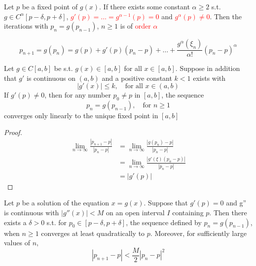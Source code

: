 \documentclass[11pt]{article}
\begin{document}
\begin{theorem}
Let $p$ be a fixed point of $g(x)$. If there exists some constant $\alpha\ge
2$ s.t. $g\in C^\alpha[p-\delta,p+\delta]$,
\textcolor{red}{$g'(p)=\dots=g^{\alpha-1}(p)=0$} and \textcolor{red}{$g^\alpha(p)\neq 0$}.
Then the iterations with $p_n=g(p_{n-1})$, $n\ge1$ is of \textcolor{red}{order $\alpha$}
\end{theorem}

\begin{equation*}
p_{n+1}=g(p_n)=g(p)+g'(p)(p_n-p)+\dots+\frac{g^\alpha(\xi_n)}{\alpha!}(p_n-p)^\alpha
\end{equation*}

\begin{theorem}
Let $g\in C[a,b]$ be s.t. $g(x)\in[a,b]$ for all $x\in[a,b]$. Suppose in
addition that $g'$ is continuous on $(a,b)$ and a positive constant $k<1$
exists with
\begin{equation*}
|g'(x)|\le k, \quad \text{for all } x\in(a,b)
\end{equation*}
If $g'(p)\neq0$, then for any number $p_0\neq p$ in $[a,b]$, the sequence
\begin{equation*}
p_n=g(p_{n-1}),\quad\text{for }n\ge 1
\end{equation*}
converges only linearly to the unique fixed point in $[a,b]$
\end{theorem}

\begin{proof}
\begin{align*}
\lim\limits_{n\to\infty}\frac{|p_{n+1}-p|}{|p_n-p|}&=
\lim\limits_{n\to\infty}\frac{|g(p_n)-p|}{|p_n-p|}\\
&=\lim\limits_{n\to\infty}\frac{|g'(\xi)(p_n-p)|}{|p_n-p|}\\
&=|g'(p)|
\end{align*}
\end{proof}

\begin{theorem}
Let $p$ be a solution of the equation $x=g(x)$. Suppose that $g'(p)=0$ and
g'' is continuous with $|g''(x)|<M$ on an open interval $I$ containing $p$.
Then there exists a $\delta>0$ s.t. for $p_0\in[p-\delta,p+\delta]$, the
sequence defined by $p_n=g(p_{n-1})$, when $n\ge 1$ converges at least
quadratically to $p$. Moreover, for sufficiently large values of $n$,
\begin{equation*}
|p_{n+1}-p|<\frac{M}{2}|p_n-p|^2
\end{equation*}
\end{theorem}
\end{document}
